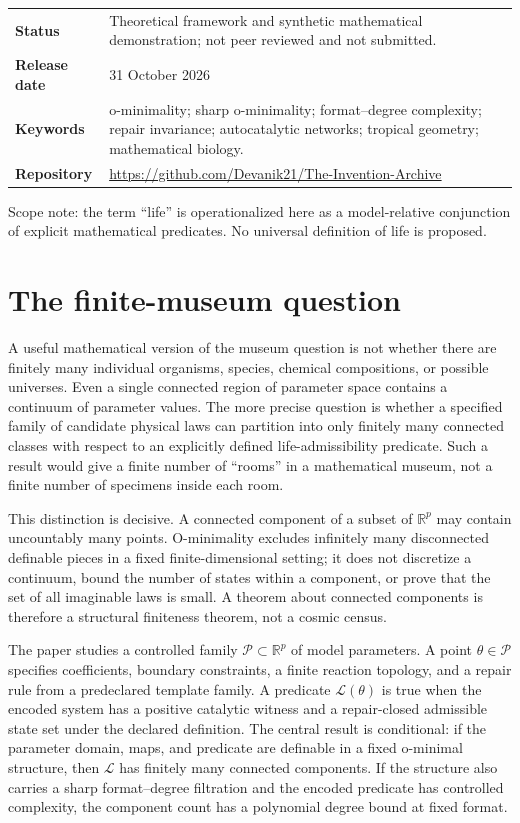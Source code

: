 \documentclass[11pt,a4paper]{article}
\theoremstyle{definition}
\theoremstyle{remark}
\newcommand{\R}{\mathbb{R}}
\newcommand{\ThetaSet}{\mathcal{P}}
\newcommand{\Life}{\mathcal{L}}
\begin{document}
\begin{titlepage}
\begin{minipage}{0.92\textwidth}
\end{minipage}
\vfill
\begin{tabularx}{\textwidth}{@{}lX@{}}
\textbf{Status} & Theoretical framework and synthetic mathematical demonstration; not peer reviewed and not submitted.\\
\textbf{Release date} & 31 October 2026\\
\textbf{Keywords} & o-minimality; sharp o-minimality; format--degree complexity; repair invariance; autocatalytic networks; tropical geometry; mathematical biology.\\
\textbf{Repository} & \url{https://github.com/Devanik21/The-Invention-Archive}
\end{tabularx}
\vspace{0.5cm}
\small\color{muted}Scope note: the term ``life'' is operationalized here as a model-relative conjunction of explicit mathematical predicates. No universal definition of life is proposed.
\end{titlepage}

\tableofcontents
\clearpage
{}

\section{The finite-museum question}
A useful mathematical version of the museum question is not whether there are finitely many individual organisms, species, chemical compositions, or possible universes. Even a single connected region of parameter space contains a continuum of parameter values. The more precise question is whether a specified family of candidate physical laws can partition into only finitely many connected classes with respect to an explicitly defined life-admissibility predicate. Such a result would give a finite number of ``rooms'' in a mathematical museum, not a finite number of specimens inside each room.

This distinction is decisive. A connected component of a subset of \(\R^p\) may contain uncountably many points. O-minimality excludes infinitely many disconnected definable pieces in a fixed finite-dimensional setting; it does not discretize a continuum, bound the number of states within a component, or prove that the set of all imaginable laws is small. A theorem about connected components is therefore a structural finiteness theorem, not a cosmic census.

The paper studies a controlled family \(\ThetaSet\subset\R^p\) of model parameters. A point \(\theta\in\ThetaSet\) specifies coefficients, boundary constraints, a finite reaction topology, and a repair rule from a predeclared template family. A predicate \(\Life(\theta)\) is true when the encoded system has a positive catalytic witness and a repair-closed admissible state set under the declared definition. The central result is conditional: if the parameter domain, maps, and predicate are definable in a fixed o-minimal structure, then \(\Life\) has finitely many connected components. If the structure also carries a sharp format--degree filtration and the encoded predicate has controlled complexity, the component count has a polynomial degree bound at fixed format.
\end{document}
